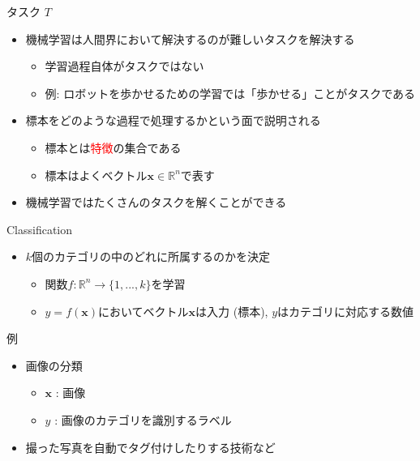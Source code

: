 \documentclass[dvipdfmx, 10pt]{beamer}
\newcommand{\green}[1]{\textcolor{green!40!black}{#1}}
\begin{document}

\begin{frame}{タスク $T$}
  \begin{itemize}
    \item 機械学習は人間界において解決するのが難しいタスクを解決する
    \begin{itemize}
      \item 学習過程自体がタスクではない
      \item 例: ロボットを歩かせるための学習では「歩かせる」ことがタスクである
    \end{itemize}
    \item 標本をどのような過程で処理するかという面で説明される
    \begin{itemize}
      \item 標本とは\textcolor{red}{特徴}の集合である
      \item 標本はよくベクトル$\bm{x} \in \mathbb{R} ^ {n}$で表す
    \end{itemize}
    \item 機械学習ではたくさんのタスクを解くことができる
  \end{itemize}
\end{frame}


\begin{frame}{Classification}
  \begin{itemize}
    \item $k$個のカテゴリの中のどれに所属するのかを決定
    \begin{itemize}
      \item 関数$f: \mathbb{R} ^ {n} \to \{1, ..., k\}$を学習
      \item $y = f(\bm{x})$においてベクトル$\bm{x}$は入力 (標本), $y$はカテゴリに対応する数値
    \end{itemize}
  \end{itemize}
  \begin{exampleblock}{例}
    \begin{itemize}
      \item 画像の分類
      \begin{itemize}
        \item $\bm{x}$ : 画像
        \item $y$ : 画像のカテゴリを識別するラベル
      \end{itemize}
    \end{itemize}
    \begin{itemize}
      \item 撮った写真を自動でタグ付けしたりする技術など
    \end{itemize}
  \end{exampleblock}
\end{frame}
\end{document}
